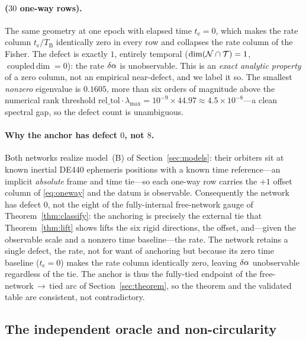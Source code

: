 \paragraph{ ($30$ one-way rows).}
The same geometry at one epoch with elapsed time $t_{\mathrm e}=0$, which makes the rate
column $t_{\mathrm e}/T_{\mathrm B}$ identically zero in every row and collapses the rate
column of the Fisher. The defect is exactly $1$, entirely temporal
($\dim(\mathcal{N}\cap\mathcal{T})=1$, $\operatorname{coupled\,dim}=0$): the rate $\delta\alpha$ is
unobservable. This is an \emph{exact analytic property} of a zero column, not an empirical
near-defect, and we label it so. The smallest \emph{nonzero} eigenvalue is $0.1605$, more
than six orders of magnitude above the numerical rank threshold
$\text{rel\_tol}\cdot\lambda_{\max}=10^{-9}\times44.97\approx4.5\times10^{-8}$---a clean
spectral gap, so the defect count is unambiguous.

\paragraph{Why the anchor has defect $0$, not $8$.}
Both networks realize model~(B) of Section~\ref{sec:models}: their orbiters sit at known
inertial DE440 ephemeris positions with a known time reference---an implicit \emph{absolute}
frame and time tie---so each one-way row carries the $+1$ offset column of \eqref{eq:oneway}
and the datum is observable. Consequently the  network has defect $0$, not
the eight of the fully-internal free-network gauge of Theorem~\ref{thm:classify}: the
anchoring is precisely the external tie that Theorem~\ref{thm:lift} shows lifts the six rigid
directions, the offset, and---given the observable scale and a nonzero time baseline---the
rate. The  network retains a single defect, the rate, not for want of
anchoring but because its zero time baseline ($t_{\mathrm e}=0$) makes the rate column
identically zero, leaving $\delta\alpha$ unobservable regardless of the tie. The anchor is thus
the fully-tied endpoint of the free-network$\,\to\,$tied arc of Section~\ref{sec:theorem}, so
the theorem and the validated table are consistent, not contradictory.

\subsection{The independent oracle and non-circularity}
\label{sec:oracle}

